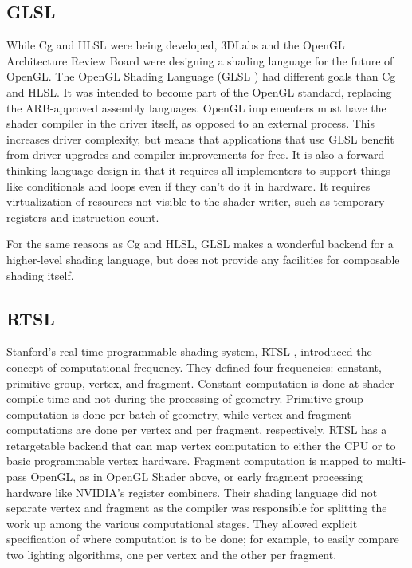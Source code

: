 \documentclass{acmsiggraph}               %
\begin{document}
\subsection{GLSL}

While Cg and HLSL were being developed, 3DLabs and the OpenGL
Architecture Review Board were designing a shading language for the
future of OpenGL.  The OpenGL Shading Language (GLSL \cite{RostGLSL})
had different goals than Cg and HLSL.  It was intended to become part
of the OpenGL standard, replacing the ARB-approved assembly languages.
OpenGL implementers must have the shader compiler in the driver
itself, as opposed to an external process.  This increases driver
complexity, but means that applications that use GLSL benefit from
driver upgrades and compiler improvements for free.  It is also a
forward thinking language design in that it requires all implementers
to support things like conditionals and loops even if they can't do it
in hardware.  It requires virtualization of resources not visible to
the shader writer, such as temporary registers and instruction count.

For the same reasons as Cg and HLSL, GLSL makes a wonderful backend
for a higher-level shading language, but does not provide any
facilities for composable shading itself.


\subsection{RTSL}

Stanford's real time programmable shading system, RTSL \cite{rtsl},
introduced the concept of computational frequency.  They defined four
frequencies: constant, primitive group, vertex, and fragment.
Constant computation is done at shader compile time and not during the
processing of geometry.  Primitive group computation is done per batch
of geometry, while vertex and fragment computations are done per
vertex and per fragment, respectively.  RTSL has a retargetable
backend that can map vertex computation to either the CPU or to basic
programmable vertex hardware.  Fragment computation is mapped to
multi-pass OpenGL, as in OpenGL Shader above, or early fragment
processing hardware like NVIDIA's register combiners.  Their shading
language did not separate vertex and fragment as the compiler was
responsible for splitting the work up among the various computational
stages.  They allowed explicit specification of where computation is
to be done; for example, to easily compare two lighting algorithms,
one per vertex and the other per fragment.
\end{document}
